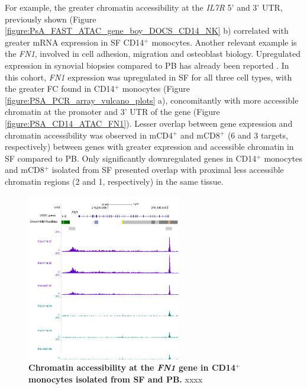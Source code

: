 For example, the greater chromatin accessibility at the \textit{IL7R} 5' and 3' UTR, previously shown (Figure \ref{figure:PsA_FAST_ATAC_gene_boy_DOCS_CD14_NK} b) correlated with greater mRNA expression in SF CD14$^+$ monocytes. Another relevant example is the \textit{FN1}, involved in cell adhesion, migration and osteoblast biology. Upregulated expression in synovial biopsies compared to PB has already been reported \parencite{Dolcino2015}. In this cohort, \textit{FN1} expression was upregulated in SF for all three cell types, with the greater FC found in CD14$^+$ monocytes (Figure \ref{figure:PSA_PCR_array_vulcano_plots} a), concomitantly with more accessible chromatin at the promoter and 3' UTR of the gene (Figure \ref{figure:PSA_CD14_ATAC_FN1}). Lesser overlap between gene expression and chromatin accessibility was observed in mCD4$^+$ and mCD8$^+$ (6 and 3 targets, respectively) between genes with greater expression and accessible chromatin in SF compared to PB. Only significantly downregulated genes in CD14$^+$ monocytes and mCD8$^+$ isolated from SF presented overlap with proximal less accessible chromatin regions (2 and 1, respectively) in the same tissue. 
	
\begin{figure}[htbp]
\centering
\includegraphics[width=0.6\textwidth]{./Results3/pdfs/PSA_CD14_ATAC_FN1_paired_gene_expression}
\caption[Chromatin accessibility at the \textit{FN1} gene in CD14$^+$ monocytes isolated from SF and PB.]{\textbf{Chromatin accessibility at the \textit{FN1} gene in CD14$^+$ monocytes isolated from SF and PB.} xxxx }
\label{fig:PSA_CD14_ATAC_FN1}
\end{figure}

